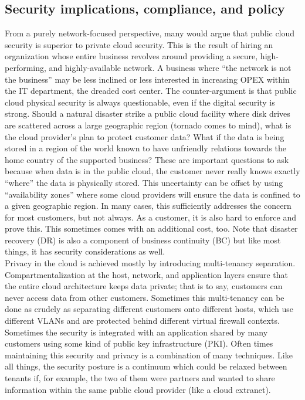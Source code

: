 \subsection{Security implications, compliance, and policy}
From a purely network-focused perspective, many would argue that public cloud
security is superior to private cloud security. This is the result of hiring
an organization whose entire business revolves around providing a secure,
high-performing, and highly-available network. A business where ``the network
is not the business'' may be less inclined or less interested in increasing
OPEX within the IT department, the dreaded cost center. The counter-argument
is that public cloud physical security is always questionable, even if the
digital security is strong. Should a natural disaster strike a public cloud
facility where disk drives are scattered across a large geographic region
(tornado comes to mind), what is the cloud provider’s plan to protect customer
data? What if the data is being stored in a region of the world known to have
unfriendly relations towards the home country of the supported business? These
are important questions to ask because when data is in the public cloud, the
customer never really knows exactly ``where'' the data is physically stored.
This uncertainty can be offset by using ``availability zones'' where some cloud
providers will ensure the data is confined to a given geographic region. In
many cases, this sufficiently addresses the concern for most customers, but
not always. As a customer, it is also hard to enforce and prove this. This
sometimes comes with an additional cost, too. Note that disaster recovery (DR)
is also a component of business continuity (BC) but like most things, it has
security considerations as well. \\

Privacy in the cloud is achieved mostly by introducing multi-tenancy
separation. Compartmentalization at the host, network, and application layers
ensure that the entire cloud architecture keeps data private; that is to say,
customers can never access data from other customers. Sometimes this
multi-tenancy can be done as crudely as separating different customers onto
different hosts, which use different VLANs and are protected behind different
virtual firewall contexts. Sometimes the security is integrated with an
application shared by many customers using some kind of public key
infrastructure (PKI). Often times maintaining this security and privacy is a
combination of many techniques. Like all things, the security posture is a
continuum which could be relaxed between tenants if, for example, the two of
them were partners and wanted to share information within the same public
cloud provider (like a cloud extranet). \\

